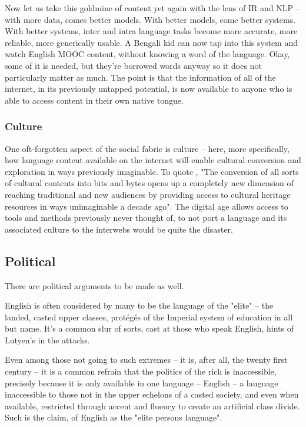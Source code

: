 \documentclass[11pt]{article}
\begin{document}
Now let us take this goldmine of content yet again with the lens of IR and NLP
-- with more data, comes better models. With better models, come better systems.
With better systems, inter and intra language tasks become more accurate, more
reliable, more generically usable. A Bengali kid can now tap into this system
and watch English MOOC content, without knowing a word of the language. Okay,
some of it is needed, but they're borrowed words anyway so it does not
particularly matter as much. The point is that the information of all of the
internet, in its previously untapped potential, is now available to anyone who
is able to access content in their own native tongue.

\subsubsection{Culture}

One oft-forgotten aspect of the social fabric is culture -- here, more
specifically, how language content available on the internet will enable
cultural conversion and exploration in ways previously imaginable. To quote
\cite{geser_digicult_2002}, "The conversion of all sorts of cultural contents 
into bits and bytes opens up a completely new dimension of reaching traditional 
and new audiences by providing access to cultural heritage resources in ways 
unimaginable a decade ago".  The digital age allows access to tools and methods
previously never thought of, to not port a language and its associated culture
to the interwebs would be quite the disaster.

\subsection{Political}

There are political arguments to be made as well.

English is often considered by many to be the language of the "elite" -- the
landed, casted upper classes, protégés of the Imperial system of education in
all but name. It's a common slur of sorts, cast at those who speak English,
hints of Lutyen's in the attacks. 

Even among those not going to such extremes -- it is, after all, the twenty 
first century -- it is a common refrain that the politics of the rich is
inaccessible, precisely because it is only available in one language -- English
-- a language inaccessible to those not in the upper echelons of a casted
society, and even when available, restricted through accent and fluency to
create an artificial class divide. Such is the claim, of English as the "elite
persons language".
\end{document}
